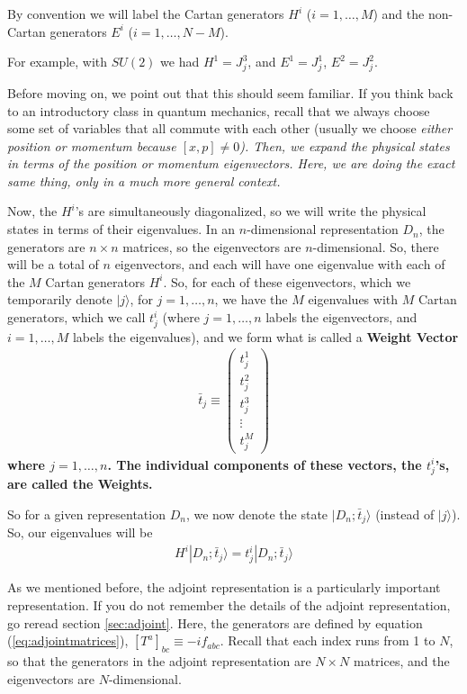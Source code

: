 \documentclass[12pt,epsf]{article}
\begin{document}
By convention we will label the Cartan generators $H^i$
($i=1,\ldots,M$) and the non-Cartan generators $E^i$ ($i=1,\ldots,N-M$).  

For example, with $SU(2)$ we had $H^1 = J^3_j$, and $E^1 = J^1_j$, $E^2
= J^2_j$.  

Before moving on, we point out that this should seem familiar.	If you
think back to an introductory class in quantum mechanics, recall that
we always choose some set of variables that all commute with each
other (usually we choose \it either \rm position or momentum because
$[x,p]\neq 0$).  Then, we expand the physical states in terms of the
position \it or \rm momentum eigenvectors.  Here, we are doing the
exact same thing, only in a much more general context.	

Now, the $H^i$'s are simultaneously diagonalized, so we will write the
physical states in terms of their eigenvalues.	In an $n$-dimensional
representation $D_n$, the generators are $n\times n$ matrices, so the
eigenvectors are $n$-dimensional.  So, there will be a total of $n$
eigenvectors, and each will have one eigenvalue with each of the $M$
Cartan generators $H^i$.  So, for each of these eigenvectors, which we
temporarily denote $|j\rangle$, for $j=1,\ldots,n$, we have the $M$
eigenvalues with $M$ Cartan generators, which we call $t^i_j$ (where
$j=1,\ldots,n$ labels the eigenvectors, and $i=1,\dots,M$ labels the
eigenvalues), and we form what is called a \bf Weight Vector\rm
\begin{eqnarray}
\bar t_j \equiv 
\begin{pmatrix}
t^1_j \\ t^2_j \\ t^3_j \\ \vdots \\t^M_j
\end{pmatrix} \label{eq:weightvectors}
\end{eqnarray}
where $j=1,\ldots,n$.  The individual components of these vectors, the
$t^i_j$'s, are called the \bf Weights\rm.  

So for a given representation $D_n$, we now denote the state $|D_n;\bar
t_j\rangle$ (instead of $|j\rangle$).  So, our eigenvalues will be 
\begin{eqnarray}
H^i|D_n;\bar t_j\rangle = t^i_j|D_n;\bar t_j\rangle \label{eq:honstate}
\end{eqnarray}

As we mentioned before, the adjoint representation is a particularly
important representation.  If you do not remember the details of the
adjoint representation, go reread section \ref{sec:adjoint}.  Here, the
generators are defined by equation (\ref{eq:adjointmatrices}),
$[T^a]_{bc} \equiv -i f_{abc}$.  Recall that each index runs from 1
to $N$, so that the generators in the adjoint representation are
$N\times N$ matrices, and the eigenvectors are $N$-dimensional.  
\end{document}
